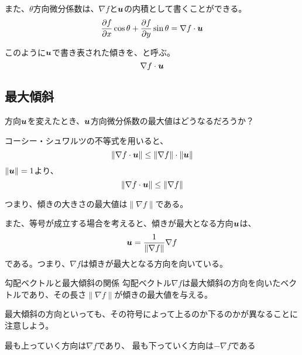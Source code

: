 \documentclass[../../../topic_calculus]{subfiles}
\begin{document}
\br

また、$\theta$方向微分係数は、$\nabla f$と$\vb*{u}$の内積として書くことができる。
\begin{equation*}
  \frac{\partial f}{\partial x}\cos \theta + \frac{\partial f}{\partial y}\sin \theta
= \nabla f \cdot \vb*{u}
\end{equation*}

\br

このように$\vb*{u}$で書き表された傾きを、と呼ぶ。
\begin{equation*}
  \nabla f \cdot \vb*{u}
\end{equation*}

\subsection{最大傾斜}

方向$\vb*{u}$を変えたとき、$\vb*{u}$方向微分係数の最大値はどうなるだろうか？

\br

コーシー・シュワルツの不等式を用いると、
\begin{equation*}
  \| \nabla f \cdot \vb*{u} \| \leq \| \nabla f \| \cdot \| \vb*{u} \|
\end{equation*}
$\| \vb*{u} \| = 1$より、
\begin{equation*}
  \| \nabla f \cdot \vb*{u} \| \leq \| \nabla f \|
\end{equation*}

\br

つまり、傾きの大きさの最大値は$\| \nabla f \|$である。

また、等号が成立する場合を考えると、傾きが最大となる方向$\vb*{u}$は、
\begin{equation*}
  \vb*{u} = \frac{1}{\| \nabla f \|} \nabla f
\end{equation*}
である。つまり、$\nabla f$は傾きが最大となる方向を向いている。

\begin{theorem}{勾配ベクトルと最大傾斜の関係}
  勾配ベクトル$\nabla f$は最大傾斜の方向を向いたベクトルであり、その長さ$\| \nabla f \|$が傾きの最大値を与える。
\end{theorem}

最大傾斜の方向といっても、その符号によって上るのか下るのかが異なることに注意しよう。

\begin{emphabox}
  \begin{spacebox}
    \begin{center}
      最も上っていく方向は$\nabla f$であり、
      最も下っていく方向は$-\nabla f$である
    \end{center}
  \end{spacebox}
\end{emphabox}
\end{document}
